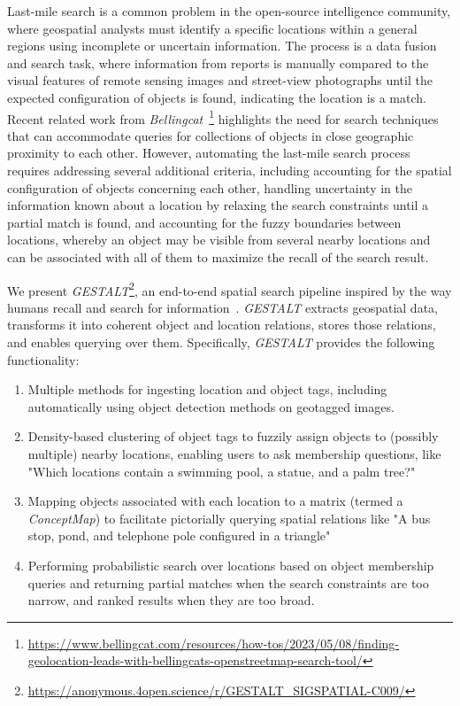 Last-mile search is a common problem in the open-source intelligence community, where geospatial analysts must identify a specific locations within a general regions using incomplete or uncertain information. 
The process is a data fusion and search task, where information from reports is manually compared to the visual features of remote sensing images and street-view photographs until the expected configuration of objects is found, indicating the location is a match.
Recent related work from \textit{Bellingcat}~\footnote{\href{https://www.bellingcat.com/resources/how-tos/2023/05/08/finding-geolocation-leads-with-bellingcats-openstreetmap-search-tool/}{https://www.bellingcat.com/resources/how-tos/2023/05/08/finding-geolocation-leads-with-bellingcats-openstreetmap-search-tool/}} highlights the need for search techniques that can accommodate queries for collections of objects in close geographic proximity to each other.
However, automating the last-mile search process requires addressing several additional criteria, including accounting for the spatial configuration of objects concerning each other, handling uncertainty in the information known about a location by relaxing the search constraints until a partial match is found, and accounting for the fuzzy boundaries between locations, whereby an object may be visible from several nearby locations and can be associated with all of them to maximize the recall of the search result.

We present \emph{GESTALT}\footnote{\url{https://anonymous.4open.science/r/GESTALT_SIGSPATIAL-C009/}}, an end-to-end spatial search pipeline inspired by the way humans recall and search for information~\cite{Helbing2020, Oliveira2016, Weisberg2016}.
\emph{GESTALT} extracts geospatial data, transforms it into coherent object and location relations, stores those relations, and enables querying over them. 
Specifically, \emph{GESTALT} provides the following functionality:
\begin{enumerate}
    \item Multiple methods for ingesting location and object tags, including automatically using object detection methods on geotagged images.
    \item Density-based clustering of object tags to fuzzily assign objects to (possibly multiple) nearby locations, enabling users to ask membership questions, like "Which locations contain a swimming pool, a statue, and a palm tree?"
    \item Mapping objects associated with each location to a matrix (termed a \emph{ConceptMap}) to facilitate pictorially querying spatial relations like "A bus stop, pond, and telephone pole configured in a triangle"
    \item Performing probabilistic search over locations based on object membership queries and returning partial matches when the search constraints are too narrow, and ranked results when they are too broad.
\end{enumerate}


